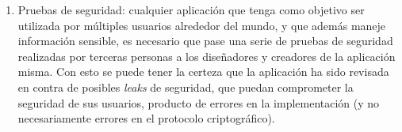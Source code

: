 \begin{enumerate}
    \item Pruebas de seguridad: cualquier aplicación que tenga como objetivo 
    ser utilizada por múltiples usuarios alrededor del mundo, y que además 
    maneje información sensible, es necesario que pase una serie de pruebas de 
    seguridad realizadas por terceras personas a los diseñadores y creadores 
    de la aplicación misma. Con esto se puede tener la certeza que la 
    aplicación ha sido revisada en contra de posibles \emph{leaks} de 
    seguridad, que puedan comprometer la seguridad de sus usuarios, producto 
    de errores en la implementación (y no necesariamente errores en el 
    protocolo criptográfico).
\end{enumerate}